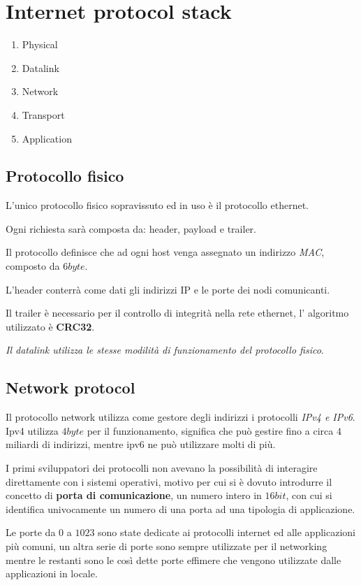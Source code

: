 \section{Internet protocol stack}
\begin{enumerate}
  \item Physical
  \item Datalink
  \item Network
  \item Transport
  \item Application
\end{enumerate}

\subsection{Protocollo fisico}
L'unico protocollo fisico sopravissuto ed in uso è il protocollo ethernet.

Ogni richiesta sarà composta da: header, payload e trailer.

Il protocollo definisce che ad ogni host venga assegnato un indirizzo
\emph{MAC}, composto da $6byte$.

L'header conterrà come dati gli indirizzi IP e le porte dei nodi comunicanti.

Il trailer è necessario per il controllo di integrità nella rete ethernet, l'
algoritmo utilizzato è \textbf{CRC32}.

\emph{Il datalink utilizza le stesse modilità di funzionamento del protocollo
fisico}.

\subsection{Network protocol}
Il protocollo network utilizza come gestore degli indirizzi i protocolli
\emph{IPv4 e IPv6}.
Ipv4 utilizza $4byte$ per il funzionamento, significa che può gestire fino a 
circa $4$ miliardi di indirizzi, mentre ipv6 ne può utilizzare molti di più.

I primi sviluppatori dei protocolli non avevano la possibilità
di interagire direttamente con i sistemi operativi, motivo per cui si è dovuto
introdurre il concetto di \textbf{porta di comunicazione}, un numero intero
in $16bit$, con cui si identifica univocamente un numero di una porta ad una
tipologia di applicazione.

Le porte da $0$ a $1023$ sono state dedicate ai protocolli internet ed alle
applicazioni più comuni, un altra serie di porte sono sempre utilizzate per
il networking  mentre le restanti sono le così dette porte effimere che vengono
utilizzate dalle applicazioni in locale.

